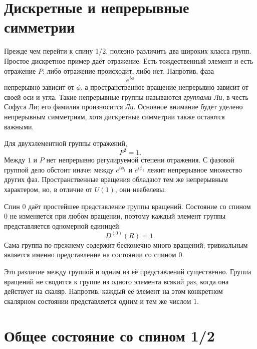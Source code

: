 \section{Дискретные и непрерывные симметрии}

Прежде чем перейти к спину 1/2, полезно различить два широких класса групп. Простое дискретное пример даёт отражение. Есть тождественный элемент и есть отражение \(P\); либо отражение происходит, либо нет. Напротив, фаза
\begin{equation}
e^{i\phi}
\end{equation}
непрерывно зависит от \(\phi\), а пространственное вращение непрерывно зависит от своей оси и угла. Такие непрерывные группы называются \emph{группами Ли}, в честь Софуса Ли; его фамилия произносится \emph{Ли}. Основное внимание будет уделено непрерывным симметриям, хотя дискретные симметрии также остаются важными.

Для двухэлементной группы отражений,
\begin{equation}
P^2=1.
\end{equation}
Между \(1\) и \(P\) нет непрерывно регулируемой степени отражения. С фазовой группой дело обстоит иначе: между \(e^{i\phi_1}\) и \(e^{i\phi_2}\) лежит непрерывное множество других фаз. Пространственные вращения обладают тем же непрерывным характером, но, в отличие от \(U(1)\), они неабелевы.

Спин 0 даёт простейшее представление группы вращений. Состояние со спином 0 не изменяется при любом вращении, поэтому каждый элемент группы представляется одномерной единицей:
\begin{equation}
D^{(0)}(R)=1.
\end{equation}
Сама группа по-прежнему содержит бесконечно много вращений; тривиальным является именно представление на состоянии со спином 0.

Это различие между группой и одним из её представлений существенно. Группа вращений не сводится к группе из одного элемента всякий раз, когда она действует на скаляр. Напротив, каждый её элемент на этом конкретном скалярном состоянии представляется одним и тем же числом \(1\).

\section{Общее состояние со спином 1/2}

